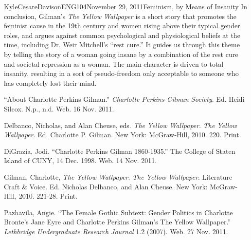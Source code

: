 \documentclass[11pt,letterpaper]{article}
\begin{document}
\begin{mla}{Kyle}{Cesare}{Davison}{ENG104}{November 29, 2011}{Feminism, by Means
of Insanity}
In conclusion, Gilman's \emph{The Yellow Wallpaper} is a short story that
promotes the feminist cause in the 19th century and women rising above their
typical gender roles, and argues against common psychological and physiological
beliefs at the time, including Dr. Weir Mitchell's ``rest cure.''  It guides us
through this theme by telling the story of a woman going insane by a combination
of the rest cure and societal repression as a woman.  The main character is
driven to total insanity, resulting in a sort of pseudo-freedom only acceptable
to someone who has completely lost their mind.

\begin{workscited}


\bibent ``About Charlotte Perkins Gilman.'' \emph{Charlotte Perkins Gilman
Society}. Ed.  Heidi Silcox. N.p., n.d. Web. 16 Nov. 2011. 

\bibent Delbanco, Nicholas, and Alan Cheuse, eds. \emph{The Yellow Wallpaper}.
\emph{The Yellow Wallpaper}. Ed. Charlotte P. Gilman. New York: McGraw-Hill,
2010. 220.  Print. 

\bibent DiGrazia, Jodi. ``Charlotte Perkins Gilman 1860-1935.'' The College of
Staten Island of CUNY, 14 Dec. 1998. Web. 14 Nov. 2011. 

\bibent Gilman, Charlotte, \emph{The Yellow Wallpaper}.  \emph{The Yellow
Wallpaper}. Literature Craft \& Voice. Ed. Nicholas Delbanco, and Alan Cheuse.
New York: McGraw-Hill, 2010. 221-28.  Print. 

\bibent Pazhavila, Angie. ``The Female Gothic Subtext: Gender Politics in
Charlotte Bronte's Jane Eyre and Charlotte Perkins Gilman's The Yellow
Wallpaper.'' \emph{Lethbridge Undergraduate Research Journal} 1.2 (2007). Web.
27 Nov. 2011. 

\end{workscited}
\end{mla}
\end{document}
